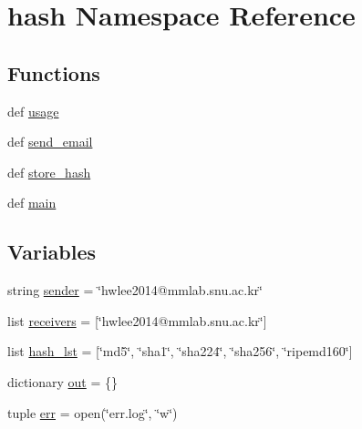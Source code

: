 \hypertarget{namespacehash}{\section{hash Namespace Reference}
\label{namespacehash}
}
\subsection*{Functions}
\begin{DoxyCompactItemize}
\item 
def \hyperlink{namespacehash_a5349d23e9c3b8b275b3ee9f2b3b4fd43}{usage}
\item 
def \hyperlink{namespacehash_a6c669271871c96ef8988eeab4cd0c1b6}{send\-\_\-email}
\item 
def \hyperlink{namespacehash_a9640499322c5cb9608ade7379d670b04}{store\-\_\-hash}
\item 
def \hyperlink{namespacehash_af869b36f249ce1c0e49ccdd552592f74}{main}
\end{DoxyCompactItemize}
\subsection*{Variables}
\begin{DoxyCompactItemize}
\item 
string \hyperlink{namespacehash_aa79adaa5d8408e6b071cfe2953502e78}{sender} = \char`\"{}hwlee2014@mmlab.\-snu.\-ac.\-kr\char`\"{}
\item 
list \hyperlink{namespacehash_a680457edb0628d619d64f3d080b23724}{receivers} = \mbox{[}\char`\"{}hwlee2014@mmlab.\-snu.\-ac.\-kr\char`\"{}\mbox{]}
\item 
list \hyperlink{namespacehash_a33f714c152121382a0314f9687cc8e1b}{hash\-\_\-lst} = \mbox{[}\char`\"{}md5\char`\"{}, \char`\"{}sha1\char`\"{}, \char`\"{}sha224\char`\"{}, \char`\"{}sha256\char`\"{}, \char`\"{}ripemd160\char`\"{}\mbox{]}
\item 
dictionary \hyperlink{namespacehash_a3bdcf340ebe26a29a908b0c139a5bde0}{out} = \{\}
\item 
tuple \hyperlink{namespacehash_a3cb88d08c0a1af562d98d1643e2c91bc}{err} = open(\char`\"{}err.\-log\char`\"{}, \char`\"{}w\char`\"{})
\end{DoxyCompactItemize}


